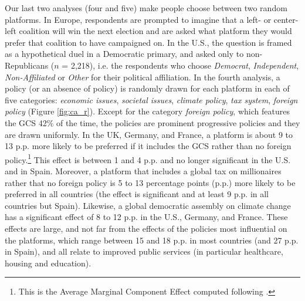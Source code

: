 Our last two analyses (four and five) make people choose between two random platforms. In Europe, respondents are prompted to imagine that a left- or center-left coalition will win the next election and are asked what platform they would prefer that coalition to have campaigned on. In the U.S., the question is framed as a hypothetical duel in a Democratic primary, and asked only to non-Republicans ($n$ = 2,218), i.e. the respondents who choose \textit{Democrat}, \textit{Independent}, \textit{Non-Affiliated} or \textit{Other} for their political affiliation. In the fourth analysis, a policy (or an absence of policy) is randomly drawn for each platform in each of five categories: \textit{economic issues}, \textit{societal issues}, \textit{climate policy}, \textit{tax system}, \textit{foreign policy} (Figure \ref{fig:ca_r}). 
Except for the category \textit{foreign policy}, which features the GCS 42\% of the time, the policies are prominent progressive policies and they are drawn uniformly. %
In the UK, Germany, and France, a platform is about 9 to 13 p.p. more likely to be preferred if it includes the GCS rather than no foreign policy.\footnote{This is the Average Marginal Component Effect computed following \citet{hainmueller_causal_2014}.} This effect is between 1 and 4 p.p. and no longer significant in the U.S. and in Spain. 
Moreover, a platform that includes a global tax on millionaires rather that no foreign policy is 5 to 13 percentage points (p.p.) more likely to be preferred in all countries (the effect is significant and at least 9 p.p. in all countries but Spain). 
Likewise, a global democratic assembly on climate change has a significant effect of 8 to 12 p.p. in the U.S., Germany, and France. 
These effects are large, and not far from the effects of the policies most influential on the platforms, which range between 15 and 18 p.p. in most countries (and 27 p.p. in Spain), and all relate to improved public services (in particular healthcare, housing and education). 

